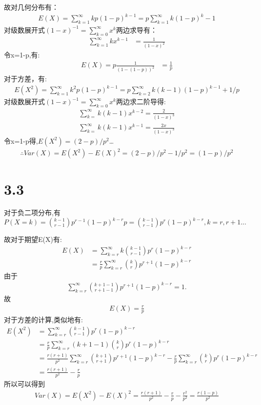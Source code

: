 \documentclass[12pt,a4paper,fontset=none]{ctexart}
\begin{document}
故对几何分布有：
\begin{align*}
	E(X)=\sum_{k=1}^\infty kp(1-p)^{k-1}=p\sum_{k=1}^\infty k(1-p)^k-1
\end{align*}
对级数展开式$(1-x)^{-1}=\sum_{k=0}^\infty x^k$两边求导有：
\begin{align*}
	\sum_{k=1}^\infty kx^{k-1} & =\frac{1}{(1-x)^2}
\end{align*}
令x=1-p,有:
\begin{align*}
	E(X)=p\frac{1}{(1-(1-p))^2} & =\frac{1}{p}
\end{align*}
对于方差，有:
\begin{align*}
	E(X^2)=\sum_{k=1}^{\infty}k^2p(1-p)^{k-1}=p\sum_{k=2}^{\infty}k(k-1)(1-p)^{k-1}+1/p
\end{align*}
对级数展开式$(1-x)^{-1}=\sum_{k=0}^\infty x^k$两边求二阶导得:
\begin{align*}
	\sum_{k=}^{\infty}k(k-1)x^{k-2}=\frac{2}{(1-x)^3} \\
	\sum_{k=}^{\infty}k(k-1)x^{k-1}=\frac{2x}{(1-x)^3}
\end{align*}
令x=1-p得,$E(X^2)=(2-p)/p^2$\dots
\begin{align*}
	\therefore Var(X)=E(X^2)-E(X)^2=(2-p)/p^2-1/p^2=(1-p)/p^2
\end{align*}
\section*{3.3}
对于负二项分布,有$P(X=k)=\binom{k-1}{r-1}p^{r-1}(1-p)^{k-r}p=\binom{k-1}{r-1}p^r(1-p)^{k-r},k=r,r+1...$

故对于期望E(X)有:
\begin{align*}
	E(X) & =\sum_{k=r}^{\infty}k\binom{k-1}{r-1}p^r(1-p)^{k-r}           \\
	     & =\frac{r}{p}\sum_{k=r}^{\infty}\binom{k}{r}p^{r+1}(1-p)^{k-r}
\end{align*}
由于\begin{align*}
	\sum_{k=r}^{\infty}\binom{k+1-1}{r+1-1}p^{r+1}(1-p)^{k-r}=1.
\end{align*}
故\begin{align*}
	E(X)=\frac{r}{p}
\end{align*}
对于方差的计算,类似地有:
\begin{align*}
	E(X^2) & =\sum_{k=r}^{\infty}\binom{k-1}{r-1}p^r(1-p)^{k-r}                                                                                \\
	       & =\frac{r}{p}\sum_{k=r}^{\infty}(k+1-1)\binom{k}{r}p^r(1-p)^{k-r}                                                                  \\
	       & =\frac{r(r+1)}{p^2}\sum_{k=r}^{\infty}\binom{k+1}{r+1}p^{r+1}(1-p)^{k-r}-\frac{r}{p}\sum_{k=r}^{\infty}\binom{k}{r}p^r(1-p)^{k-r} \\
	       & =\frac{r(r+1)}{p^2}-\frac{r}{p}
\end{align*}
所以可以得到
\begin{align*}
	Var(X)=E(X^2)-E(X)^2=\frac{r(r+1)}{p^2}-\frac{r}{p}-\frac{r^2}{p^2}=\frac{r(1-p)}{p^2}
\end{align*}
\end{document}

